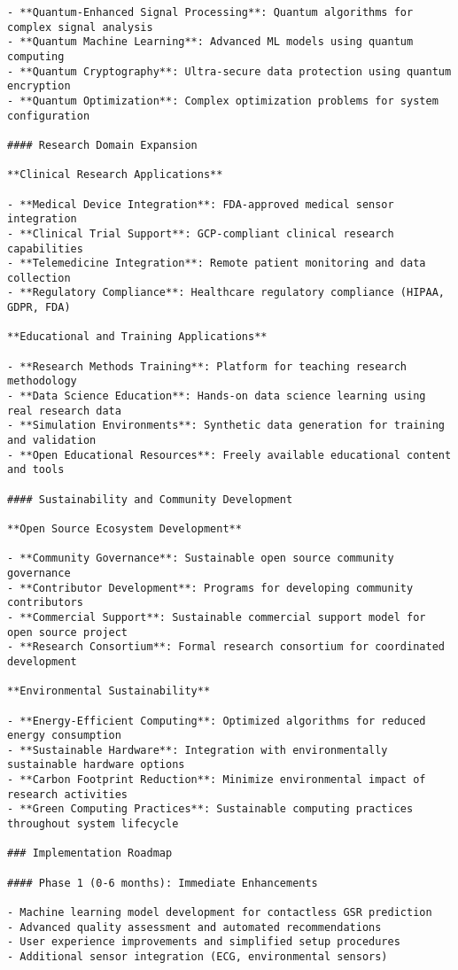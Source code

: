 \documentclass[11pt,a4paper]{report}
\begin{document}
\begin{verbatim}
- **Quantum-Enhanced Signal Processing**: Quantum algorithms for complex signal analysis
- **Quantum Machine Learning**: Advanced ML models using quantum computing
- **Quantum Cryptography**: Ultra-secure data protection using quantum encryption
- **Quantum Optimization**: Complex optimization problems for system configuration

#### Research Domain Expansion

**Clinical Research Applications**

- **Medical Device Integration**: FDA-approved medical sensor integration
- **Clinical Trial Support**: GCP-compliant clinical research capabilities
- **Telemedicine Integration**: Remote patient monitoring and data collection
- **Regulatory Compliance**: Healthcare regulatory compliance (HIPAA, GDPR, FDA)

**Educational and Training Applications**

- **Research Methods Training**: Platform for teaching research methodology
- **Data Science Education**: Hands-on data science learning using real research data
- **Simulation Environments**: Synthetic data generation for training and validation
- **Open Educational Resources**: Freely available educational content and tools

#### Sustainability and Community Development

**Open Source Ecosystem Development**

- **Community Governance**: Sustainable open source community governance
- **Contributor Development**: Programs for developing community contributors
- **Commercial Support**: Sustainable commercial support model for open source project
- **Research Consortium**: Formal research consortium for coordinated development

**Environmental Sustainability**

- **Energy-Efficient Computing**: Optimized algorithms for reduced energy consumption
- **Sustainable Hardware**: Integration with environmentally sustainable hardware options
- **Carbon Footprint Reduction**: Minimize environmental impact of research activities
- **Green Computing Practices**: Sustainable computing practices throughout system lifecycle

### Implementation Roadmap

#### Phase 1 (0-6 months): Immediate Enhancements

- Machine learning model development for contactless GSR prediction
- Advanced quality assessment and automated recommendations
- User experience improvements and simplified setup procedures
- Additional sensor integration (ECG, environmental sensors)


\end{verbatim}
\end{document}
